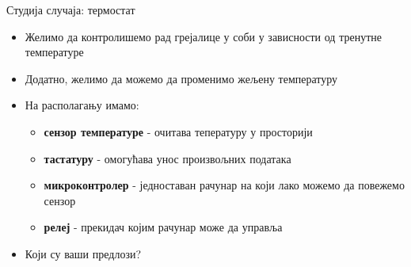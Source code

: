 \documentclass[xcolor=table]{beamer}
\begin{document}
    \begin{frame}{Студија случаја: термостат}
        \begin{itemize}
            \item Желимо да контролишемо рад грејалице у соби у зависности од тренутне температуре
            \item Додатно, желимо да можемо да променимо жељену температуру
            \item На располагању имамо:
            \begin{itemize}
                \item \textbf{сензор температуре} - очитава тепературу у просторији
                \item \textbf{тастатуру} - омогућава унос произвољних података
                \item \textbf{микроконтролер} - једноставан рачунар на који лако можемо да повежемо сензор
                \item \textbf{релеј} - прекидач којим рачунар може да управља
            \end{itemize}
            \item Који су ваши предлози?
        \end{itemize}
    \end{frame}
\end{document}
